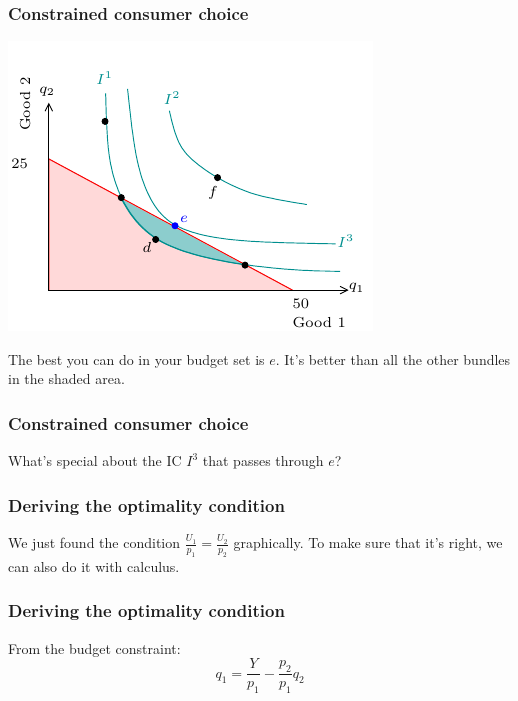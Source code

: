 \documentclass[xcolor=pdftex,dvipsnames]{beamer}
\begin{document}
\begin{frame}
\frametitle{Constrained consumer choice}
\begin{center}\includegraphics{pics/ConstrainedChoice3}\end{center}
The best you can do in your budget set is $e$.
It's better than all the other bundles in the {\color{CarnationPink}shaded} area.
\end{frame}


\begin{frame}
\frametitle{Constrained consumer choice}
What's special about the IC $I^3$ that passes through $e$?

\bigskip{}\bigskip





\end{frame}

\begin{frame}
\frametitle{Deriving the optimality condition}
We just found the condition $\frac{U_1}{p_1} = \frac{U_2}{p_2}$
graphically.
To make sure that it's right, we can also do it with calculus.
\bigskip
{}
\end{frame}
\begin{frame}
\frametitle{Deriving the optimality condition}
From the budget constraint:\[q_1=\frac{Y}{p_1}-\frac{p_2}{p_1}q_2
\]

\end{frame}
\end{document}
